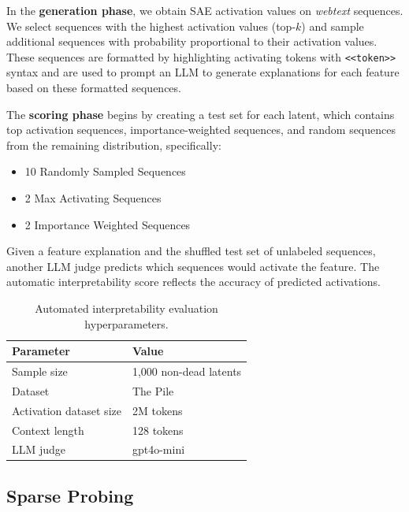 \documentclass{article}
\theoremstyle{plain}
\theoremstyle{definition}
\theoremstyle{remark}
\begin{document}
In the \textbf{generation phase}, we obtain SAE activation values on \textit{webtext} sequences. We select sequences with the highest activation values (top-$k$) and sample additional sequences with probability proportional to their activation values. These sequences are formatted by highlighting activating tokens with \texttt{<<token>>} syntax and are used to prompt an LLM to generate explanations for each feature based on these formatted sequences.

The \textbf{scoring phase} begins by creating a test set for each latent, which contains top activation sequences, importance-weighted sequences, and random sequences from the remaining distribution, specifically:
\begin{itemize}
\item 10 Randomly Sampled Sequences
\item 2 Max Activating Sequences
\item 2 Importance Weighted Sequences
\end{itemize}

Given a feature explanation and the shuffled test set of unlabeled sequences, another LLM judge predicts which sequences would activate the feature. The automatic interpretability score reflects the accuracy of predicted activations.

\begin{table}[h!]
    \centering
    \begin{tabular}{|l|l|}
        \hline
        \textbf{Parameter}             & \textbf{Value}                  \\ \hline
        Sample size             & 1,000 non-dead latents          \\ \hline
        Dataset                        & The Pile                        \\ \hline
        Activation dataset size        & 2M tokens                       \\ \hline
        Context length                 & 128 tokens                      \\ \hline
        LLM judge                      & gpt4o-mini                      \\ \hline
    \end{tabular}
    \caption{Automated interpretability evaluation hyperparameters.}
    \label{tab:autointerp-parameters}
\end{table}

\subsection*{Sparse Probing}
\end{document}
